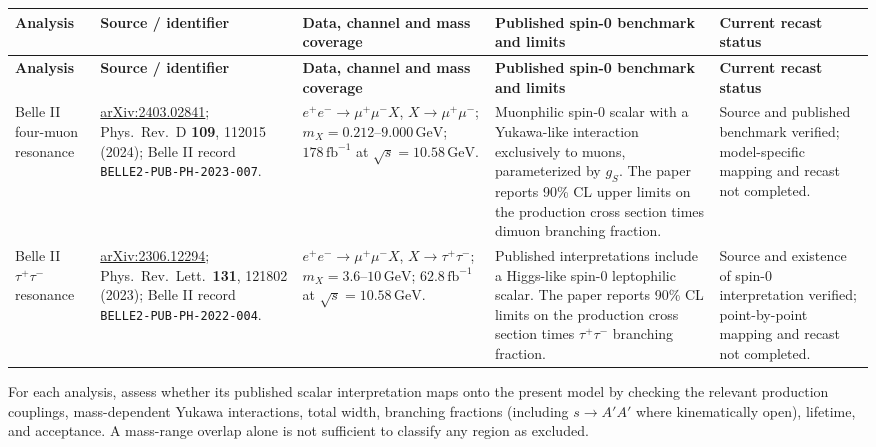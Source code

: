 \documentclass[
]{article}
\begin{document}
\begin{longtable}{p{} p{} p{} p{} p{}}
\hline
\textbf{Analysis} &
\textbf{Source / identifier} &
\textbf{Data, channel and mass coverage} &
\textbf{Published spin-0 benchmark and limits} &
\textbf{Current recast status} \\
\hline
\endfirsthead

\hline
\textbf{Analysis} &
\textbf{Source / identifier} &
\textbf{Data, channel and mass coverage} &
\textbf{Published spin-0 benchmark and limits} &
\textbf{Current recast status} \\
\hline
\endhead

Belle II four-muon resonance &
\href{https://arxiv.org/abs/2403.02841}{arXiv:2403.02841};
Phys.\ Rev.\ D \textbf{109}, 112015 (2024);
Belle II record \texttt{BELLE2-PUB-PH-2023-007}. &
\(e^+e^-\to\mu^+\mu^-X\), \(X\to\mu^+\mu^-\);
\(m_X=0.212\text{--}9.000\,\mathrm{GeV}\);
\(178\,\mathrm{fb}^{-1}\) at
\(\sqrt{s}=10.58\,\mathrm{GeV}\). &
Muonphilic spin-0 scalar with a Yukawa-like interaction exclusively to muons, parameterized by \(g_S\). The paper reports 90\% CL upper limits on the production cross section times dimuon branching fraction. &
Source and published benchmark verified; model-specific mapping and recast not completed. \\
\hline

Belle II \(\tau^+\tau^-\) resonance &
\href{https://arxiv.org/abs/2306.12294}{arXiv:2306.12294};
Phys.\ Rev.\ Lett.\ \textbf{131}, 121802 (2023);
Belle II record \texttt{BELLE2-PUB-PH-2022-004}. &
\(e^+e^-\to\mu^+\mu^-X\), \(X\to\tau^+\tau^-\);
\(m_X=3.6\text{--}10\,\mathrm{GeV}\);
\(62.8\,\mathrm{fb}^{-1}\) at
\(\sqrt{s}=10.58\,\mathrm{GeV}\). &
Published interpretations include a Higgs-like spin-0 leptophilic scalar. The paper reports 90\% CL limits on the production cross section times \(\tau^+\tau^-\) branching fraction. &
Source and existence of spin-0 interpretation verified; point-by-point mapping and recast not completed. \\
\hline
\end{longtable}

For each analysis, assess whether its published scalar interpretation maps
onto the present model by checking the relevant production couplings,
mass-dependent Yukawa interactions, total width, branching fractions
(including \(s\to A'A'\) where kinematically open), lifetime, and
acceptance. A mass-range overlap alone is not sufficient to classify any
region as excluded.
\end{document}
